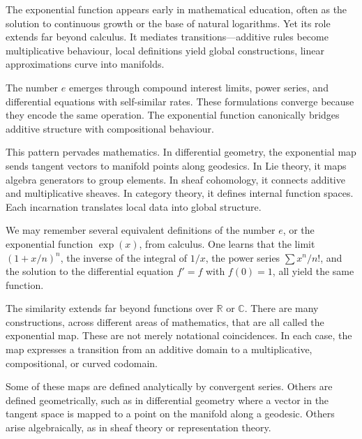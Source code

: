 The exponential function appears early in mathematical education, often as the solution to continuous growth or the base of natural logarithms. Yet its role extends far beyond calculus. It mediates transitions—additive rules become multiplicative behaviour, local definitions yield global constructions, linear approximations curve into manifolds.

The number \( e \) emerges through compound interest limits, power series, and differential equations with self-similar rates. These formulations converge because they encode the same operation. The exponential function canonically bridges additive structure with compositional behaviour.

This pattern pervades mathematics. In differential geometry, the exponential map sends tangent vectors to manifold points along geodesics. In Lie theory, it maps algebra generators to group elements. In sheaf cohomology, it connects additive and multiplicative sheaves. In category theory, it defines internal function spaces. Each incarnation translates local data into global structure.

We may remember several equivalent definitions of the number \( e \), or the exponential function \( \exp(x) \), from calculus. One learns that the limit $\left(1 + x/n\right)^n$,
the inverse of the integral of \( 1/x \), the power series \( \sum x^n/n! \), and the solution to the differential equation \( f' = f \) with \( f(0) = 1 \), all yield the same function.

The similarity extends far beyond functions over \( \mathbb{R} \) or \( \mathbb{C} \). There are many constructions, across different areas of mathematics, that are all called \QSOpen{}the exponential map.\QSClose{} These are not merely notational coincidences. In each case, the map expresses a transition from an additive domain to a multiplicative, compositional, or curved codomain.

Some of these maps are defined analytically by convergent series. Others are defined geometrically, such as in differential geometry where a vector in the tangent space is mapped to a point on the manifold along a geodesic. Others arise algebraically, as in sheaf theory or representation theory. 


